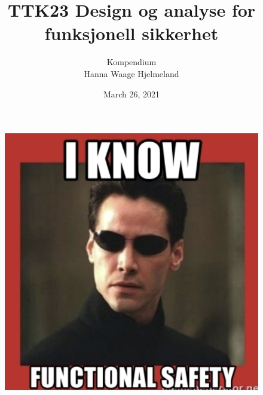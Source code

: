 \documentclass[11pt, a4paper, USenglish]{article} %
\begin{document}
\title{TTK23 Design og analyse for funksjonell sikkerhet}
\author{Kompendium\\
Hanna Waage Hjelmeland}
\date{March 26, 2021}
\begin{titlepage}
    \maketitle
    \begin{figure}[h]
    \centering
        \includegraphics[width=\textwidth]{figures/FaultBasics/robot.png}\\   
    \end{figure}

   \thispagestyle{empty}
\end{titlepage}

%
\newpage
\newpage
\tableofcontents
{}
\thispagestyle{empty}

\newpage
\setcounter{page}{1}











\newpage
\printbibliography
\label{sec:bibliography}
\end{document}
